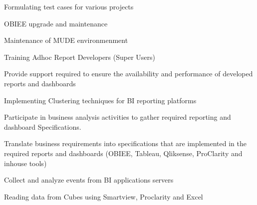\begin{cventries}
{\begin{cvitems}
\item Formulating test cases for various projects
\item OBIEE upgrade and maintenance
\item Maintenance of MUDE environmenment
\item Training Adhoc Report Developers (Super Users)
\item Provide support required to ensure the availability and performance of developed reports and dashboards
\item Implementing Clustering techniques for BI reporting platforms
\item Participate in business analysis activities to gather required reporting and dashboard Specifications.
\item Translate business requirements into specifications that are implemented in the required reports and dashboards (OBIEE, Tableau, Qliksense, ProClarity and inhouse tools)
\item Collect and analyze events from BI applications servers
\item Reading data from Cubes using Smartview, Proclarity and Excel
\end{cvitems}
}



\end{cventries}
